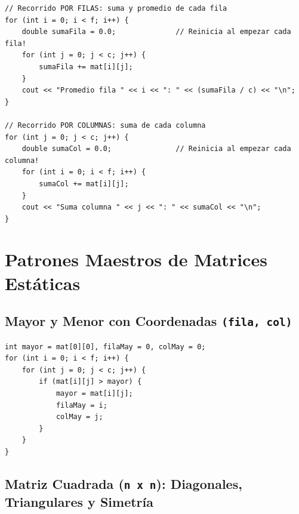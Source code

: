 \documentclass[11pt,letterpaper]{article}
\begin{document}
\begin{lstlisting}[style=cppmonitoria]
// Recorrido POR FILAS: suma y promedio de cada fila
for (int i = 0; i < f; i++) {
    double sumaFila = 0.0;              // Reinicia al empezar cada fila!
    for (int j = 0; j < c; j++) {
        sumaFila += mat[i][j];
    }
    cout << "Promedio fila " << i << ": " << (sumaFila / c) << "\n";
}

// Recorrido POR COLUMNAS: suma de cada columna
for (int j = 0; j < c; j++) {
    double sumaCol = 0.0;               // Reinicia al empezar cada columna!
    for (int i = 0; i < f; i++) {
        sumaCol += mat[i][j];
    }
    cout << "Suma columna " << j << ": " << sumaCol << "\n";
}
\end{lstlisting}

\section{Patrones Maestros de Matrices Estáticas}

\subsection{Mayor y Menor con Coordenadas \texttt{(fila, col)}}
\begin{lstlisting}[style=cppmonitoria]
int mayor = mat[0][0], filaMay = 0, colMay = 0;
for (int i = 0; i < f; i++) {
    for (int j = 0; j < c; j++) {
        if (mat[i][j] > mayor) {
            mayor = mat[i][j];
            filaMay = i;
            colMay = j;
        }
    }
}
\end{lstlisting}

\subsection{Matriz Cuadrada (\texttt{n x n}): Diagonales, Triangulares y Simetría}
\end{document}
